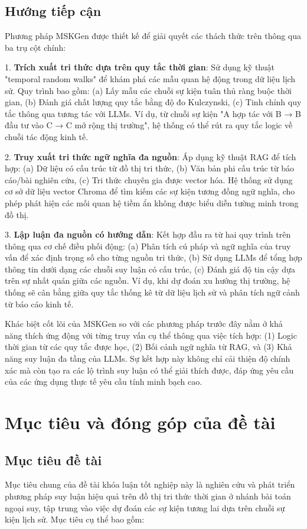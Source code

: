 \subsection{Hướng tiếp cận}
Phương pháp MSKGen được thiết kế để giải quyết các thách thức trên thông qua ba trụ cột chính:

1. \textbf{Trích xuất tri thức dựa trên quy tắc thời gian}: Sử dụng kỹ thuật "temporal random walks" để khám phá các mẫu quan hệ động trong dữ liệu lịch sử. Quy trình bao gồm: (a) Lấy mẫu các chuỗi sự kiện tuân thủ ràng buộc thời gian, (b) Đánh giá chất lượng quy tắc bằng độ đo Kulczynski, (c) Tinh chỉnh quy tắc thông qua tương tác với LLMs. Ví dụ, từ chuỗi sự kiện "A hợp tác với B → B đầu tư vào C → C mở rộng thị trường", hệ thống có thể rút ra quy tắc logic về chuỗi tác động kinh tế.

2. \textbf{Truy xuất tri thức ngữ nghĩa đa nguồn}: Áp dụng kỹ thuật RAG để tích hợp: (a) Dữ liệu có cấu trúc từ đồ thị tri thức, (b) Văn bản phi cấu trúc từ báo cáo/bài nghiên cứu, (c) Tri thức chuyên gia được vector hóa. Hệ thống sử dụng cơ sở dữ liệu vector Chroma để tìm kiếm các sự kiện tương đồng ngữ nghĩa, cho phép phát hiện các mối quan hệ tiềm ẩn không được biểu diễn tường minh trong đồ thị.

3. \textbf{Lập luận đa nguồn có hướng dẫn}: Kết hợp đầu ra từ hai quy trình trên thông qua cơ chế điều phối động: (a) Phân tích cú pháp và ngữ nghĩa của truy vấn để xác định trọng số cho từng nguồn tri thức, (b) Sử dụng LLMs để tổng hợp thông tin dưới dạng các chuỗi suy luận có cấu trúc, (c) Đánh giá độ tin cậy dựa trên sự nhất quán giữa các nguồn. Ví dụ, khi dự đoán xu hướng thị trường, hệ thống sẽ cân bằng giữa quy tắc thống kê từ dữ liệu lịch sử và phân tích ngữ cảnh từ báo cáo kinh tế.

Khác biệt cốt lõi của MSKGen so với các phương pháp trước đây nằm ở khả năng thích ứng động với từng truy vấn cụ thể thông qua việc tích hợp: (1) Logic thời gian từ các quy tắc được học, (2) Bối cảnh ngữ nghĩa từ RAG, và (3) Khả năng suy luận đa tầng của LLMs. Sự kết hợp này không chỉ cải thiện độ chính xác mà còn tạo ra các lộ trình suy luận có thể giải thích được, đáp ứng yêu cầu của các ứng dụng thực tế yêu cầu tính minh bạch cao.

\section{Mục tiêu và đóng góp của đề tài}

\subsection{Mục tiêu đề tài}
Mục tiêu chung của đề tài khóa luận tốt nghiệp này là nghiên cứu và phát triển phương pháp suy luận hiệu quả trên đồ thị tri thức thời gian ở nhánh bài toán ngoại suy, tập trung vào việc dự đoán các sự kiện tương lai dựa trên chuỗi sự kiện lịch sử. Mục tiêu cụ thể bao gồm:

